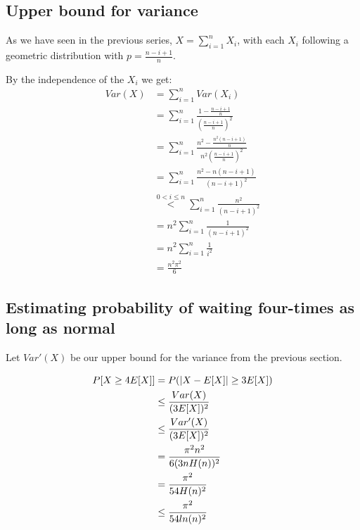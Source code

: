 \documentclass[a4paper]{scrreprt}
\DeclarePairedDelimiter\abs{\lvert}{\rvert}
\begin{document}
\subsection{Upper bound for variance}

As we have seen in the previous series, $X = \sum_{i=1}^n{X_i}$, with each
$X_i$ following a geometric distribution with $p = \frac{n-i+1}{n}$.

By the independence of the $X_i$ we get:
\begin{align*}
	Var(X) & = \sum_{i=1}^n{Var(X_i)} \\
	& = \sum_{i=1}^n{\frac{1 - \frac{n-i+1}{n}}{\left(\frac{n-i+1}{n}\right)^2}} \\
	& = \sum_{i=1}^n{\frac{n^2 - \frac{n^2 (n-i+1)}{n}}{n^2 \left(\frac{n-i+1}{n}\right)^2}} \\
	& = \sum_{i=1}^n{\frac{n^2 - n (n-i+1)}{(n-i+1)^2}} \\
	& \overset{0 < i \leq n}{<} \sum_{i=1}^n{\frac{n^2}{(n-i+1)^2}} \\
	& = n^2 \sum_{i=1}^n{\frac{1}{(n-i+1)^2}} \\
	& = n^2 \sum_{i=1}^n{\frac{1}{i^2}} \\
	& = \frac{n^2 \pi^2}{6}
\end{align*}

\subsection{Estimating probability of waiting four-times as long as normal}

Let $Var'(X)$ be our upper bound for the variance from the previous section.

\begin{align*}
	P[X \geq 4 E[X]] & = P(\abs{X - E[X]} \geq 3 E[X]) \\
	& \leq \frac{Var(X)}{(3 E[X])^2} \\
	& \leq \frac{Var'(X)}{(3 E[X])^2} \\
	& = \frac{\pi^2 n^2}{6 (3 n H(n))^2} \\
	& = \frac{\pi^2}{54 H(n)^2} \\
	& \leq \frac{\pi^2}{54 ln(n)^2}
\end{align*}
\end{document}
